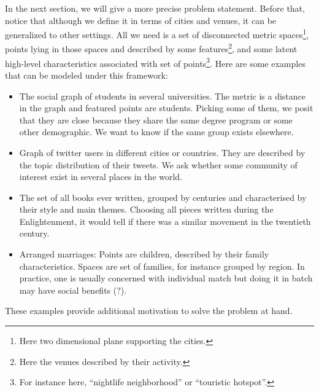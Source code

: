 In the next section, we will give a more precise problem statement. Before
that, notice that although we define it in terms of cities and venues, it can
be generalized to other settings. All we need is a set of disconnected metric
spaces\footnote{Here two dimensional plane supporting the cities.}, points
lying in those spaces and described by some features\footnote{Here the venues
described by their activity.}, and some latent high-level characteristics
associated with set of points\footnote{For instance here, \enquote{nightlife
neighborhood} or \enquote{touristic hotspot}.}. Here are some examples that
can be modeled under this framework:
\begin{itemize}
	\item The social graph of students in several universities. The metric
		is a distance in the graph and featured points are students.
		Picking some of them, we posit that they are close because
		they share the same degree program or some other demographic.
		We want to know if the same group exists elsewhere.
	\item Graph of twitter users in different cities or countries. They
		are described by the topic distribution of their tweets. We
		ask whether some community of interest exist in several places
		in the world.
	\item The set of all books ever written, grouped by centuries and
		characterised by their style and main themes. Choosing all
		pieces written during the Enlightenment, it would tell if
		there was a similar movement in the twentieth century.
	\item Arranged marriages: Points are children, described by their family
		characteristics. Spaces are set of families, for instance grouped by
		region. In practice, one is usually concerned with individual match
		but doing it in batch may have social benefits (?).
\end{itemize}
These examples provide additional motivation to solve the problem at hand.
